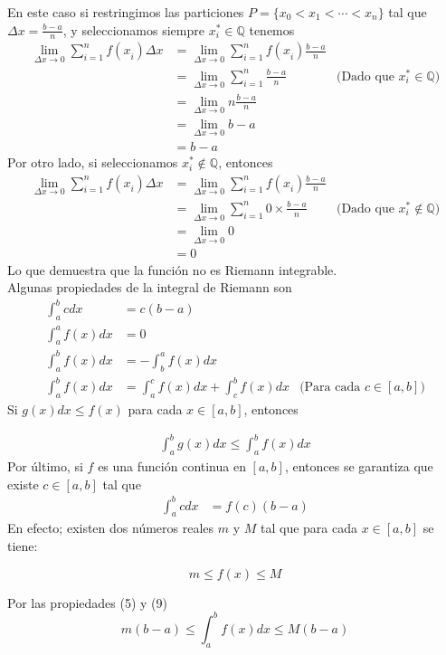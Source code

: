 \documentclass[12pt]{book}
\begin{document}
\newpage
En este caso si restringimos las particiones $P=\{x_0<x_1<\cdots<x_n\}$ tal que $\Delta x=\frac{b-a}{n}$, y seleccionamos siempre $x_i^{*}\in\mathbb{Q}$ tenemos
\begin{align*}
    \lim_{\Delta x\to 0}\sum_{i=1}^{n}f(x_i^{})\Delta x&=\lim_{\Delta x\to 0}\sum_{i=1}^{n}f(x_i^{})\frac{b-a}{n}\\
    &=\lim_{\Delta x\to 0}\sum_{i=1}^{n}\frac{b-a}{n}&\text{(Dado que $x_i^{*}\in\mathbb{Q}$)}\\
    &=\lim_{\Delta x\to 0}n\frac{b-a}{n}\\
    &=\lim_{\Delta x\to 0}b-a\\
    &=b-a
    \end{align*}
Por otro lado, si seleccionamos $x_i^{*}\notin\mathbb{Q}$, entonces
\begin{align*}
	\lim_{\Delta x\to 0}\sum_{i=1}^{n}f(x_i^{})\Delta x&=\lim_{\Delta x\to 0}\sum_{i=1}^{n}f(x_i^{})\frac{b-a}{n}\\
	&=\lim_{\Delta x\to 0}\sum_{i=1}^{n}0\times\frac{b-a}{n}&\text{(Dado que $x_i^{*}\notin\mathbb{Q}$)}\\
	&=\lim_{\Delta x\to 0}0\\
	&=0
\end{align*}
Lo que demuestra que la función no es Riemann integrable.\\
\vfill
Algunas propiedades de la integral de Riemann son
\begin{align}
	\int_{a}^{b}cdx&=c(b-a)\\
	\int_{a}^{a}f(x)dx&=0\\
	\int_{a}^{b}f(x)dx&=-\int_{b}^{a}f(x)dx\\
	\int_{a}^{b}f(x)dx&=\int_{a}^{c}f(x)dx+\int_{c}^{b}f(x)dx&\text{(Para cada $c \in\left[a,b\right]$)}
\end{align}
\newpage
Si $g(x)dx\leq f(x)$ para cada $x\in\left[a,b\right]$, entonces

\begin{align}
	\int_{a}^{b}g(x)dx\leq\int_{a}^{b}f(x)dx
\end{align}
Por último, si $f$ es una función continua en $\left[a,b\right]$, entonces se garantiza que existe $c \in\left[a,b\right]$ tal que
\begin{align}
	\int_{a}^{b}cdx&=f(c)(b-a)
\end{align}
En efecto; existen dos números reales $m$ y $M$ tal que para cada $x \in\left[a,b\right]$ se tiene:

$$m\leq f(x)\leq M$$

Por las propiedades (5) y (9)
$$m(b-a)\leq\int_{a}^{b}f(x)dx\leq M(b-a)$$
\end{document}
